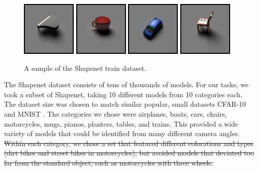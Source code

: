 \documentclass[10pt,twocolumn,letterpaper]{article}
\begin{document}
\begin{figure}[h!]
\centering
\includegraphics[width=0.24\columnwidth]{./assets/piano.jpg}
\includegraphics[width=0.24\columnwidth]{./assets/mug.jpg}
\includegraphics[width=0.24\columnwidth]{./assets/car.jpg}
\includegraphics[width=0.24\columnwidth]{./assets/chair.jpg}
\caption{A sample of the Shapenet train dataset.}
\label{fig:SHAPENET}
\end{figure}

The Shapenet dataset consists of tens of thousands of models. For our tasks, we took a subset of Shapenet, taking 10 different models from 10 categories each. The dataset size was chosen to match similar popular, small datasets CFAR-10 \cite{Krizhevsky09learningmultiple} and MNIST \cite{726791}. The categories we chose were airplanes, boats, cars, chairs, motorcycles, mugs, pianos, planters, tables, and trains. This provided a wide variety of models that could be identified from many different camera angles. \sout{Within each category, we chose a set that featured different colorations and types (dirt bikes and street bikes in motorcycles), but avoided models that deviated too far from the standard object, such as motorcycles with three wheels.}
\end{document}
